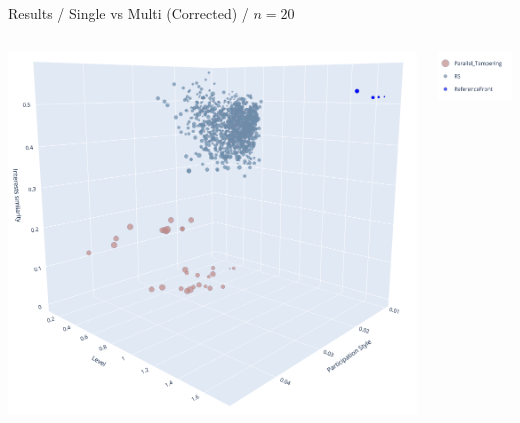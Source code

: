 \documentclass{beamer}
\begin{document}
    \begin{frame}{Results / Single vs Multi (Corrected) / $n=20$}
            \begin{columns}
                \begin{column}{0.70\textwidth}
                    \includegraphics[width=\textwidth]{images/20_both_rev.png}
                \end{column}
                \begin{column}{0.30\textwidth}
                    \includegraphics[width=\textwidth]{images/legend_both_rev.png}
                \end{column}
            \end{columns}\\
    \end{frame}
    
\end{document}
